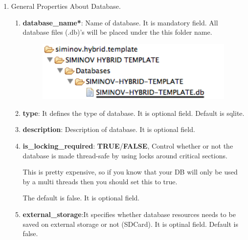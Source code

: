 \begin{enumerate}

	\item \small General Properties About Database.

		\begin{enumerate}

			\item \small \textbf{database\_name*}: Name of database. It is mandatory field. All database files (.db)'s will be placed under the this folder name.

			\begin{figure}[htbp]
				\centering
					\includegraphics[height=3cm]{Resources/siminov_hybrid_template_application_data_folder_structure_for_database_name.png}
			\end{figure}

			\item \small \textbf{type}: It defines the type of database. It is optional field. Default is sqlite.

			\item \small \textbf{description}: Description of database. It is optional field.
			\item \small \textbf{is\_locking\_required}: \textbf{TRUE}/\textbf{FALSE}, Control whether or not the database is made thread-safe by using locks around critical sections. 
				
				\par
				This is pretty expensive, so if you know that your DB will only be used by a multi threads then you should set this to true. 

				\par
				The default is false. It is optional field. 
			

			\item \small \textbf{external\_storage}:It specifies whether database resources needs to be saved on external storage or not (SDCard). It is optinal field. Default is false.

			\begin{center}
				\colorbox{grey}{
					\parbox[t]{.8\linewidth}{
						\fontsize{11pt}{11pt}\selectfont %
						\vspace*{0.1cm} %
		
}}
\end{center}
\end{enumerate}
\end{enumerate}
